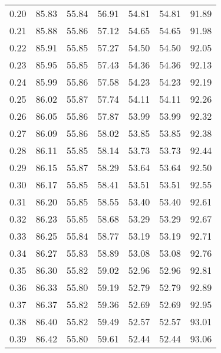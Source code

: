 \begin{tabular}{|c|c|c|c|c|c|c|}
      0.20 &     85.83 &     55.84 &      56.91 &   54.81 &      54.81 &         91.89 \\
      0.21 &     85.88 &     55.86 &      57.12 &   54.65 &      54.65 &         91.98 \\
      0.22 &     85.91 &     55.85 &      57.27 &   54.50 &      54.50 &         92.05 \\
      0.23 &     85.95 &     55.85 &      57.43 &   54.36 &      54.36 &         92.13 \\
      0.24 &     85.99 &     55.86 &      57.58 &   54.23 &      54.23 &         92.19 \\
      0.25 &     86.02 &     55.87 &      57.74 &   54.11 &      54.11 &         92.26 \\
      0.26 &     86.05 &     55.86 &      57.87 &   53.99 &      53.99 &         92.32 \\
      0.27 &     86.09 &     55.86 &      58.02 &   53.85 &      53.85 &         92.38 \\
      0.28 &     86.11 &     55.85 &      58.14 &   53.73 &      53.73 &         92.44 \\
      0.29 &     86.15 &     55.87 &      58.29 &   53.64 &      53.64 &         92.50 \\
      0.30 &     86.17 &     55.85 &      58.41 &   53.51 &      53.51 &         92.55 \\
      0.31 &     86.20 &     55.85 &      58.55 &   53.40 &      53.40 &         92.61 \\
      0.32 &     86.23 &     55.85 &      58.68 &   53.29 &      53.29 &         92.67 \\
      0.33 &     86.25 &     55.84 &      58.77 &   53.19 &      53.19 &         92.71 \\
      0.34 &     86.27 &     55.83 &      58.89 &   53.08 &      53.08 &         92.76 \\
      0.35 &     86.30 &     55.82 &      59.02 &   52.96 &      52.96 &         92.81 \\
      0.36 &     86.33 &     55.80 &      59.19 &   52.79 &      52.79 &         92.89 \\
      0.37 &     86.37 &     55.82 &      59.36 &   52.69 &      52.69 &         92.95 \\
      0.38 &     86.40 &     55.82 &      59.49 &   52.57 &      52.57 &         93.01 \\
      0.39 &     86.42 &     55.80 &      59.61 &   52.44 &      52.44 &         93.06 \\

\end{tabular}
